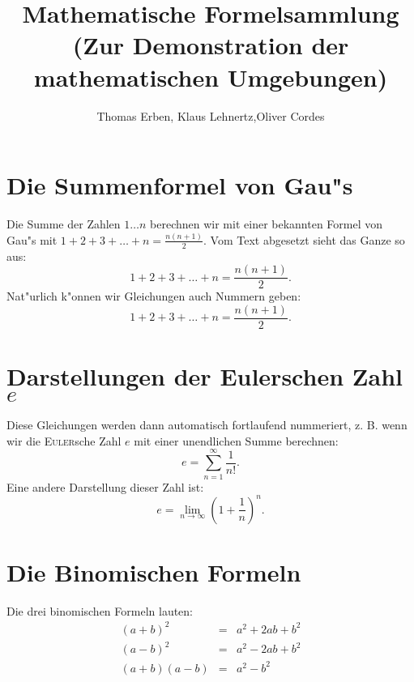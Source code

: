 \documentclass[a4paper]{article}
\begin{document}
\title{Mathematische Formelsammlung \\
(Zur Demonstration der mathematischen Umgebungen)}
\author{Thomas Erben, Klaus Lehnertz,Oliver Cordes}
\maketitle

%
%
%
\section{Die Summenformel von Gau"s}
Die Summe der Zahlen $1\ldots n$ berechnen wir mit einer bekannten Formel
von Gau"s mit $1+2+3+\ldots+n=\frac{n(n+1)}{2}$. Vom Text abgesetzt sieht 
das Ganze so aus:
%
\[
  1+2+3+\ldots+n=\frac{n(n+1)}{2}.
\]
%
Nat"urlich k"onnen wir Gleichungen auch Nummern geben:
%
\begin{equation}
  1+2+3+\ldots+n=\frac{n(n+1)}{2}.
\end{equation}
%
\section{Darstellungen der {\sc Euler}schen Zahl $e$}
Diese Gleichungen werden dann automatisch fortlaufend nummeriert, z. B. wenn wir
die \textsc{Euler}sche Zahl $e$ mit einer unendlichen Summe berechnen:
%
\begin{equation}
  e=\sum_{n=1}^{\infty}\frac{1}{n!}.
\end{equation}
%
Eine andere Darstellung dieser Zahl ist:
%
\begin{equation}
  e=\lim_{n\to\infty}\left(1+\frac{1}{n}\right)^{n}.
\end{equation}
%
\section{Die Binomischen Formeln}
Die drei binomischen Formeln lauten:
%
\begin{eqnarray}
  (a+b)^{2} & = & a^{2}+2ab+b^{2} \nonumber \\
  (a-b)^{2} & = & a^{2}-2ab+b^{2}  \\
  (a+b)(a-b) & = & a^{2}-b^{2} \nonumber
\end{eqnarray}
%
\end{document}
